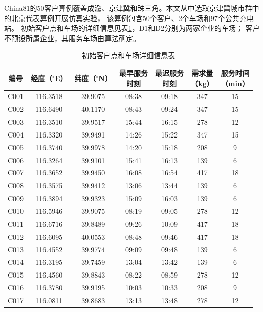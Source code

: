 \documentclass{setp-new}
\begin{document}
China81的50客户算例覆盖成渝、京津冀和珠三角。本文从中选取京津冀城市群中的北京代表算例开展仿真实验，
该算例包含50个客户、2个车场和97个公共充电站。
初始客户点和车场的详细信息见表\ref{tab:initial-nodes}，D1和D2分别为两家企业的车场；
客户不预设所属企业，其服务车场由算法确定。

\begin{table}[H]
\centering
\caption{初始客户点和车场详细信息表}
\label{tab:initial-nodes}
\small
\renewcommand{\arraystretch}{0.88}
\setlength{\tabcolsep}{1.2pt}
\begin{tabular*}{\textwidth}{@{\extracolsep{\fill}}ccccccc@{}}
\toprule
编号 & 经度（$^{\circ}$E） & 纬度（$^{\circ}$N） & \makecell{最早服务\\时刻} & \makecell{最迟服务\\时刻} & \makecell{需求量\\（kg）} & \makecell{服务时间\\（min）}\\
\midrule
C001 & 116.3518 & 39.9075 & 08:38 & 09:18 & 347 & 15\\
C002 & 116.6490 & 40.1170 & 08:43 & 09:24 & 347 & 15\\
C003 & 116.3510 & 39.9517 & 15:44 & 16:15 & 278 & 12\\
C004 & 116.3320 & 39.9491 & 14:26 & 15:22 & 347 & 15\\
C005 & 116.3740 & 39.9978 & 14:20 & 15:18 & 208 & 9\\
C006 & 116.3264 & 39.9101 & 15:41 & 16:13 & 139 & 6\\
C007 & 116.3652 & 39.9450 & 16:08 & 16:54 & 417 & 18\\
C008 & 116.3575 & 39.9412 & 13:06 & 13:44 & 139 & 6\\
C009 & 116.3894 & 39.9323 & 15:09 & 16:03 & 139 & 6\\
C010 & 116.5946 & 39.9075 & 08:19 & 09:05 & 278 & 12\\
C011 & 116.6716 & 39.8489 & 09:26 & 10:09 & 417 & 18\\
C012 & 116.6095 & 40.0553 & 08:48 & 09:46 & 417 & 18\\
C013 & 116.4552 & 39.9774 & 09:09 & 09:48 & 139 & 6\\
C014 & 116.3195 & 39.7459 & 13:04 & 13:42 & 139 & 6\\
C015 & 116.4560 & 39.8843 & 08:22 & 08:59 & 278 & 12\\
C016 & 116.3780 & 39.9195 & 10:03 & 10:33 & 208 & 9\\
C017 & 116.0811 & 39.8683 & 13:13 & 13:48 & 278 & 12\\

\end{tabular*}
\end{table}
\end{document}
